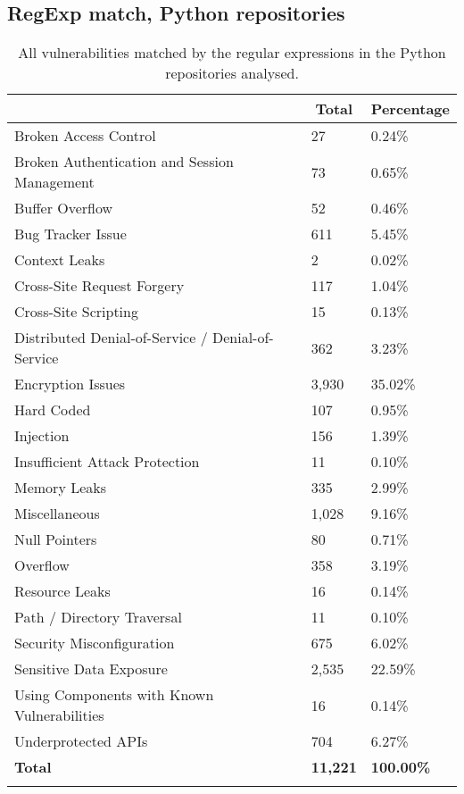 \documentclass[acb16zje.tex]{subfiles}
\begin{document}
\subsection{RegExp match, Python repositories}
\begin{longtable}{|l|l|l|}
  \hline \endfirsthead \rowcolor[HTML]{D8D8D8}
  \multicolumn{1}{|c|}{Vulnerabilities} & \multicolumn{1}{|c|}{Total} &
  \multicolumn{1}{|c|}{Percentage} \\ \hline
  Broken Access Control & 27 & 0.24\% \\
  Broken Authentication and Session Management & 73 & 0.65\% \\
  Buffer Overflow & 52 & 0.46\% \\
  Bug Tracker Issue & 611 & 5.45\% \\
  Context Leaks & 2 & 0.02\% \\
  Cross-Site Request Forgery & 117 & 1.04\% \\
  Cross-Site Scripting & 15 & 0.13\% \\
  Distributed Denial-of-Service / Denial-of-Service & 362 & 3.23\% \\
  Encryption Issues & 3,930 & 35.02\% \\
  Hard Coded & 107 & 0.95\% \\
  Injection & 156 & 1.39\% \\
  Insufficient Attack Protection & 11 & 0.10\% \\
  Memory Leaks & 335 & 2.99\% \\
  Miscellaneous & 1,028 & 9.16\% \\
  Null Pointers & 80 & 0.71\% \\
  Overflow & 358 & 3.19\% \\
  Resource Leaks & 16 & 0.14\% \\
  Path / Directory Traversal & 11 & 0.10\% \\
  Security Misconfiguration & 675 & 6.02\% \\
  Sensitive Data Exposure & 2,535 & 22.59\% \\
  Using Components with Known Vulnerabilities & 16 & 0.14\% \\
  Underprotected APIs & 704 & 6.27\% \\ \hline
  \textbf{Total} & \textbf{11,221} & \textbf{100.00\%} \\ \hline
  \caption{All vulnerabilities matched by the regular expressions in the Python repositories
  analysed.}
\end{longtable}
\end{document}
